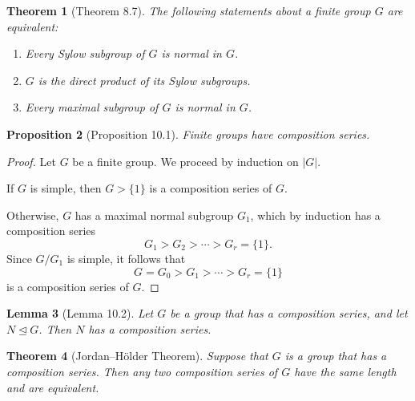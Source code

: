 \documentclass[titlepage]{article}
\theoremstyle{plain}
\newtheorem{theorem}{Theorem}[section]
\newtheorem{lemma}[theorem]{Lemma}
\newtheorem{proposition}[theorem]{Proposition}
\theoremstyle{definition}
\theoremstyle{remark}
\theoremstyle{exercise-style}
\numberwithin{equation}{section}
\numberwithin{theorem}{section}
\numberwithin{remark}{section}
\begin{document}
\begin{myboxg}
    \begin{theorem}[Theorem 8.7]
    The following statements about a finite group $G$ are equivalent:
        \begin{enumerate}
            \item Every Sylow subgroup of $G$ is normal in $G$.
            \item $G$ is the direct product of its Sylow subgroups.
            \item Every maximal subgroup of $G$ is normal in $G$.
        \end{enumerate}
    \end{theorem}
\end{myboxg}

\begin{myboxg}
    \begin{proposition}[Proposition 10.1]
        Finite groups have composition series.
    \end{proposition}
\end{myboxg}

\begin{proof}
    Let $G$ be a finite group. We proceed by induction on $|G|$.
    
    If $G$ is simple, then $G > \{1\}$ is a composition series of $G$.
    
    Otherwise, $G$ has a maximal normal subgroup $G_1$, which by induction 
    has a composition series
    \[
    G_1 > G_2 > \cdots > G_r = \{1\}.
    \]
    Since $G/G_1$ is simple, it follows that
    \[
    G = G_0 > G_1 > \cdots > G_r = \{1\}
    \]
    is a composition series of $G$.
\end{proof}

\begin{myboxg}
    \begin{lemma}[Lemma 10.2]
        Let $G$ be a group that has a composition series, and let $N \trianglelefteq G$. 
        Then $N$ has a composition series.
    \end{lemma}
\end{myboxg}

\begin{myboxg}
    \begin{theorem}[Jordan--Hölder Theorem]
        Suppose that $G$ is a group that has a composition series. Then any two 
        composition series of $G$ have the same length and are equivalent.
    \end{theorem}
\end{myboxg}
\end{document}
